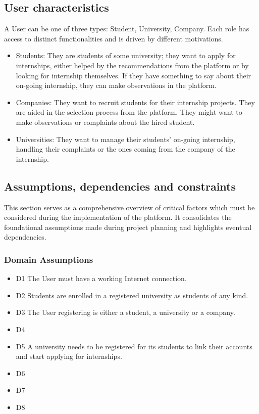 \documentclass{article}
\begin{document}
\subsection{User characteristics}
     A User can be one of three types: Student, University, Company. Each role has access to distinct functionalities and is driven by different motivations.
     \begin{itemize}
        \item Students: They are students of some university; they want to apply for internships, either helped by the recommendations from the platform or by looking for internship themselves. If they have something to say about their on-going internship, they can make observations in the platform.
        \item Companies: They want to recruit students for their internship projects. They are aided in the selection process from the platform. They might want to make observations or complaints about the hired student.
        \item Universities: They want to manage their students' on-going internship, handling their complaints or the ones coming from the company of the internship.     
     \end{itemize}
\subsection{Assumptions, dependencies and constraints}
This section serves as a comprehensive overview of critical factors which must be considered during the implementation of the platform. It consolidates the foundational assumptions made during project planning and highlights eventual dependencies.
\subsubsection{Domain Assumptions}
    \begin{itemize}
        \item D1 The User must have a working Internet connection.
        \item D2 Students are enrolled in a registered university as students of any kind.
        \item D3 The User registering is either a student, a university or a company.
        \item D4 
        \item D5 A university needs to be registered for its students to link their accounts and start applying for internships.
        \item D6 
        \item D7
        \item D8 
        
    \end{itemize}
\end{document}
